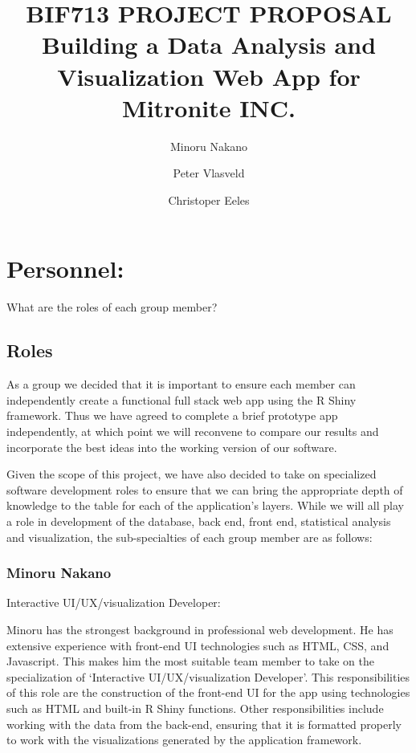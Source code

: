 \documentclass[10pt,twocolumn,letterpaper]{article}
\title{
		\usefont{OT1}{bch}{b}{n}
		\normalfont \normalsize \textsc{BIF713 PROJECT PROPOSAL} \\ [14pt]
		\huge Building a Data Analysis and Visualization Web App for Mitronite INC. \\
}
\author{Minoru Nakano}
\author{Peter Vlasveld}
\author{Christoper Eeles}
\begin{document}
\maketitle


\section{Personnel:}
    	
    	What are the roles of each group member?

            \subsection{Roles}

            As a group we decided that it is important to ensure each member can independently create a functional full stack web app using the R Shiny framework. 
	    Thus we have agreed to complete a brief prototype app independently, at which point we will reconvene to compare our results and incorporate the best 
	    ideas into the working version of our software.

            Given the scope of this project, we have also decided to take on specialized software development roles to ensure that we can bring the appropriate depth 
	    of knowledge to the table for each of the application's layers. 
	    While we will all play a role in development of the database, back end, front end, statistical analysis and visualization, the sub-specialties of each group 
	    member are as follows:

                \subsubsection*{Minoru Nakano}

                Interactive UI/UX/visualization Developer:

		Minoru has the strongest background in professional web development.
		He has extensive experience with front-end UI technologies such as HTML, CSS, and Javascript.
		This makes him the most suitable team member to take on the specialization of `Interactive UI/UX/visualization Developer'.
		This responsibilities of this role are the construction of the front-end UI for the app using technologies such as HTML and built-in R Shiny functions.
		Other responsibilities include working with the data from the back-end, ensuring that it is formatted properly to work with the visualizations generated 
		by the application framework. 
\end{document}
